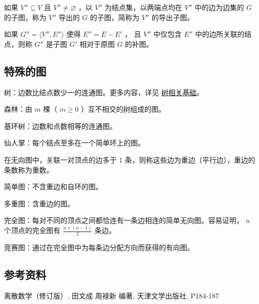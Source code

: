 如果 $V''\subseteq V$ 且 $V'' \neq \varnothing$ ，以 $V''$ 为结点集，以两端点均在 $V''$ 中的边为边集的 $G$ 的子图，称为 $V''$ 导出的 $G$ 的子图，简称为 $V''$ 的导出子图。

如果 $G''= \langle V'',E''\rangle$ 使得 $E''=E-E'$ ， 且 $V''$ 中仅包含 $E''$ 中的边所关联的结点，则称 $G''$ 是子图 $G'$ 相对于原图 $G$ 的补图。

\subsection{特殊的图}

树：边数比结点数少一的连通图。更多内容，详见 \href{/graph/tree-basic/}{树相关基础}。

森林：由 $m$ 棵（ $m\ge 0$ ）互不相交的树组成的图。

基环树：边数和点数相等的连通图。

仙人掌：每个结点至多在一个简单环上的图。

在无向图中，关联一对顶点的边多于 1 条，则称这些边为重边（平行边），重边的条数称为重数。

简单图：不含重边和自环的图。

多重图：含重边的图。

完全图：每对不同的顶点之间都恰连有一条边相连的简单无向图。容易证明， $n$ 个顶点的完全图有 $\frac{n\times (n-1)}{2}$ 条边。

竞赛图：通过在完全图中为每条边分配方向而获得的有向图。

\subsection{参考资料}

离散数学（修订版）, 田文成 周禄新 编著, 天津文学出版社, P184-187
